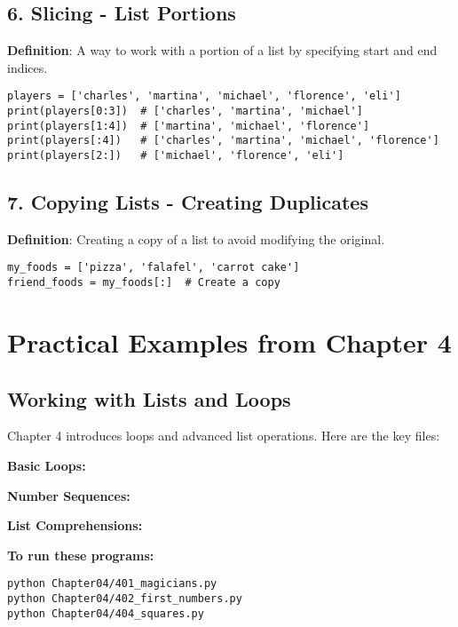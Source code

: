 

\subsection*{6. Slicing - List Portions}
\textbf{Definition}: A way to work with a portion of a list by specifying start and end indices.

\begin{lstlisting}
players = ['charles', 'martina', 'michael', 'florence', 'eli']
print(players[0:3])  # ['charles', 'martina', 'michael']
print(players[1:4])  # ['martina', 'michael', 'florence']
print(players[:4])   # ['charles', 'martina', 'michael', 'florence']
print(players[2:])   # ['michael', 'florence', 'eli']
\end{lstlisting}

\subsection*{7. Copying Lists - Creating Duplicates}
\textbf{Definition}: Creating a copy of a list to avoid modifying the original.

\begin{lstlisting}
my_foods = ['pizza', 'falafel', 'carrot cake']
friend_foods = my_foods[:]  # Create a copy
\end{lstlisting}

\section*{Practical Examples from Chapter 4}

\subsection*{Working with Lists and Loops}
Chapter 4 introduces loops and advanced list operations. Here are the key files:

\textbf{Basic Loops:}


\textbf{Number Sequences:}


\textbf{List Comprehensions:}


\textbf{To run these programs:}
\begin{verbatim}
python Chapter04/401_magicians.py
python Chapter04/402_first_numbers.py
python Chapter04/404_squares.py
\end{verbatim}

